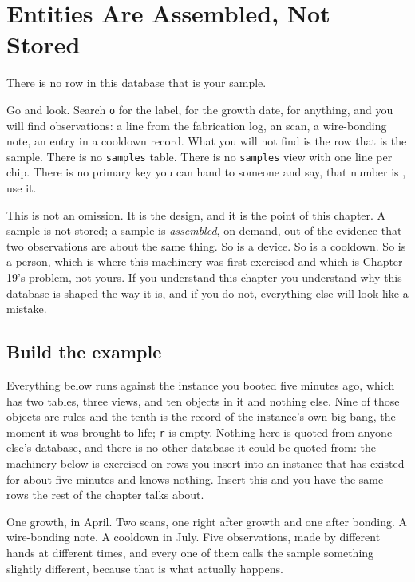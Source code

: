 \chapter{Entities Are Assembled, Not Stored}

There is no row in this database that is your sample.

Go and look. Search \texttt{o} for the label, for the growth date, for anything, and you will find observations: a line from the fabrication log, an \labInstrumentShort{} scan, a wire-bonding note, an entry in a cooldown record. What you will not find is the row that is the sample. There is no \texttt{samples} table. There is no \texttt{samples} view with one line per chip. There is no primary key you can hand to someone and say, that number is \labSample, use it.

This is not an omission. It is the design, and it is the point of this chapter. A sample is not stored; a sample is \emph{assembled}, on demand, out of the evidence that two observations are about the same thing. So is a device. So is a cooldown. So is a person, which is where this machinery was first exercised and which is Chapter 19's problem, not yours. If you understand this chapter you understand why this database is shaped the way it is, and if you do not, everything else will look like a mistake.

\section{Build the example}

Everything below runs against the instance you booted five minutes ago, which has two tables, three views, and ten objects in it and nothing else. Nine of those objects are rules and the tenth is the record of the instance's own big bang, the moment it was brought to life; \texttt{r} is empty. Nothing here is quoted from anyone else's database, and there is no other database it could be quoted from: the machinery below is exercised on rows you insert into an instance that has existed for about five minutes and knows nothing. Insert this and you have the same rows the rest of the chapter talks about.

One growth, in April. Two \labInstrumentShort{} scans, one right after growth and one after bonding. A wire-bonding note. A cooldown in July. Five observations, made by different hands at different times, and every one of them calls the sample something slightly different, because that is what actually happens.

